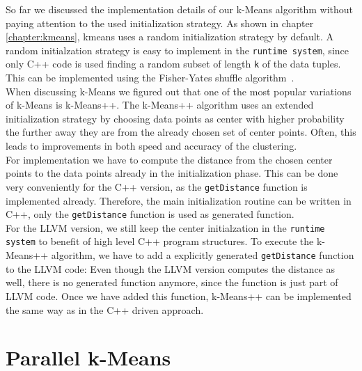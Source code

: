 So far we discussed the implementation details of our k-Means algorithm without paying attention to the used initialization strategy. As shown in chapter \ref{chapter:kmeans}, kmeans uses a random initialization strategy by default. A random initialzation strategy is easy to implement in the \texttt{runtime system}, since only C++ code is used finding a random subset of length \texttt{k} of the data tuples. This can be implemented using the Fisher-Yates shuffle algorithm~\parencite{fisheryates}. 
\\
When discussing k-Means we figured out that one of the most popular variations of k-Means is k-Means++. The k-Means++ algorithm uses an extended initialization strategy by choosing data points as center with higher probability the further away they are from the already chosen set of center points. Often, this leads to improvements in both speed and accuracy of the clustering.
\\
For implementation we have to compute the distance from the chosen center points to the data points already in the initialization phase. This can be done very conveniently for the C++ version, as the \texttt{getDistance} function is implemented already. Therefore, the main initialization routine can be written in C++, only the \texttt{getDistance} function is used as generated function.
\\
For the LLVM version, we still keep the center initialzation in the \texttt{runtime system} to benefit of high level C++ program structures. To execute the k-Means++ algorithm, we have to add a explicitly generated \texttt{getDistance} function to the LLVM code: Even though the LLVM version computes the distance as well, there is no generated function anymore, since the function is just part of LLVM code. Once we have added this function, k-Means++ can be implemented the same way as in the C++ driven approach.

\section{Parallel k-Means}

